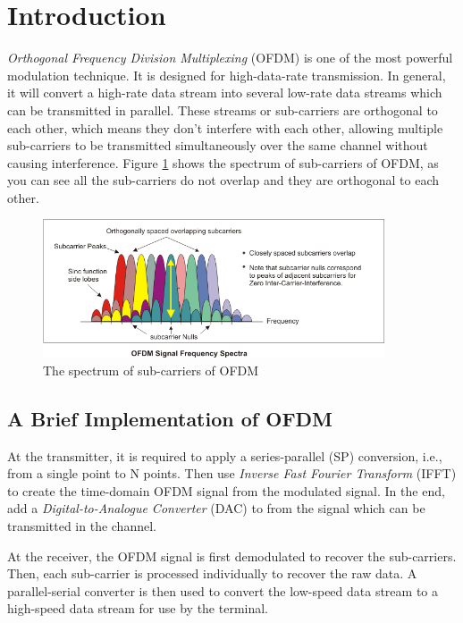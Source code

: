 \documentclass[11pt]{article}
\numberwithin{figure}{section}
\numberwithin{equation}{section}
\begin{document}
\pagestyle{plain}
\setcounter{page}{1}

\section{Introduction}
\textit{Orthogonal Frequency Division Multiplexing} (OFDM) is one of the most powerful modulation technique. It is designed for high-data-rate transmission. In general, it will convert a high-rate data stream into several low-rate data streams which can be transmitted in parallel\cite{RN79}. These streams or sub-carriers are orthogonal to each other, which means they don't interfere with each other, allowing multiple sub-carriers to be transmitted simultaneously over the same channel without causing interference. Figure \ref{fig:subcarriers} shows the spectrum of sub-carriers of OFDM, as you can see all the sub-carriers do not overlap and they are orthogonal to each other.\cite{RN80}

\begin{figure}[!ht]
    \centering
    \includegraphics[width=0.9\textwidth]{images/subcarriers.png}
    \caption{\label{fig:subcarriers}The spectrum of sub-carriers of OFDM}
\end{figure}

\subsection{A Brief Implementation of OFDM}
At the transmitter, it is required to apply a series-parallel (SP) conversion, i.e., from a single point to N points. Then use \textit{Inverse Fast Fourier Transform} (IFFT) to create the time-domain OFDM signal from the modulated signal. In the end, add a \textit{Digital-to-Analogue Converter} (DAC) to from the signal which can be transmitted in the channel.

At the receiver, the OFDM signal is first demodulated to recover the sub-carriers. Then, each sub-carrier is processed individually to recover the raw data. A parallel-serial converter is then used to convert the low-speed data stream to a high-speed data stream for use by the terminal.
\end{document}
